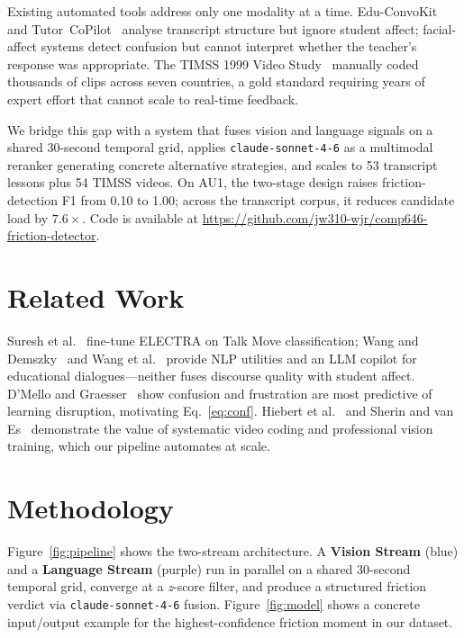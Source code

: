 \documentclass[10pt,twocolumn,letterpaper]{article}
\begin{document}
Existing automated tools address only one modality at a time.
Edu-ConvoKit~\cite{educonvokit} and Tutor~CoPilot~\cite{tutorcopilot}
analyse transcript structure but ignore student affect;
facial-affect systems detect confusion but cannot interpret whether
the teacher's response was appropriate.  The TIMSS 1999 Video
Study~\cite{timss1999video} manually coded thousands of clips across
seven countries, a gold standard requiring years of expert effort
that cannot scale to real-time feedback.

We bridge this gap with a system that fuses vision and language
signals on a shared 30-second temporal grid, applies
\texttt{claude-sonnet-4-6} as a multimodal reranker generating
concrete alternative strategies, and scales to 53 transcript lessons
plus 54 TIMSS videos.  On AU1, the two-stage design raises
friction-detection F1 from 0.10 to 1.00; across the transcript
corpus, it reduces candidate load by $7.6\times$.
Code is available at \url{https://github.com/jw310-wjr/comp646-friction-detector}.


\section{Related Work}

Suresh et al.~\cite{talkmovesaaai} fine-tune ELECTRA on Talk Move
classification; Wang and Demszky~\cite{educonvokit} and Wang et
al.~\cite{tutorcopilot} provide NLP utilities and an LLM copilot for
educational dialogues---neither fuses discourse quality with student affect.
D'Mello and Graesser~\cite{dmello2012} show confusion and frustration are
most predictive of learning disruption, motivating Eq.~\ref{eq:conf}.
Hiebert et al.~\cite{timss1999video} and Sherin and van
Es~\cite{sherinvanes2009} demonstrate the value of systematic video coding
and professional vision training, which our pipeline automates at scale.

\section{Methodology}
\label{sec:method}

Figure~\ref{fig:pipeline} shows the two-stream architecture.
A \textbf{Vision Stream} (blue) and a \textbf{Language Stream} (purple)
run in parallel on a shared 30-second temporal grid, converge at a
\emph{z}-score filter, and produce a structured friction verdict via
\texttt{claude-sonnet-4-6} fusion.  Figure~\ref{fig:model} shows a
concrete input/output example for the highest-confidence friction
moment in our dataset.
\end{document}

